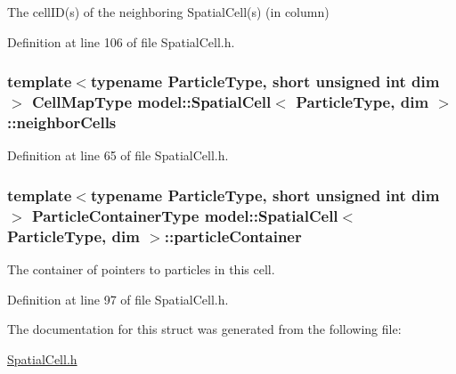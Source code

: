 The cell\+I\+D(s) of the neighboring Spatial\+Cell(s) (in column) 



Definition at line 106 of file Spatial\+Cell.\+h.

\hypertarget{structmodel_1_1_spatial_cell_ab164893960e35ae32ae48cb036543206}{}
\subsubsection[{neighbor\+Cells}]{\setlength{\rightskip}{0pt plus 5cm}template$<$typename Particle\+Type, short unsigned int dim$>$ {\bf Cell\+Map\+Type} {\bf model\+::\+Spatial\+Cell}$<$ Particle\+Type, {\bf dim} $>$\+::neighbor\+Cells}\label{structmodel_1_1_spatial_cell_ab164893960e35ae32ae48cb036543206}


Definition at line 65 of file Spatial\+Cell.\+h.

\hypertarget{structmodel_1_1_spatial_cell_a3caa85674c51c29e30b00bb8f7aa753c}{}
\subsubsection[{particle\+Container}]{\setlength{\rightskip}{0pt plus 5cm}template$<$typename Particle\+Type, short unsigned int dim$>$ {\bf Particle\+Container\+Type} {\bf model\+::\+Spatial\+Cell}$<$ Particle\+Type, {\bf dim} $>$\+::particle\+Container}\label{structmodel_1_1_spatial_cell_a3caa85674c51c29e30b00bb8f7aa753c}


The container of pointers to particles in this cell. 



Definition at line 97 of file Spatial\+Cell.\+h.



The documentation for this struct was generated from the following file\+:\begin{DoxyCompactItemize}
\item 
\hyperlink{_spatial_cell_8h}{Spatial\+Cell.\+h}\end{DoxyCompactItemize}
